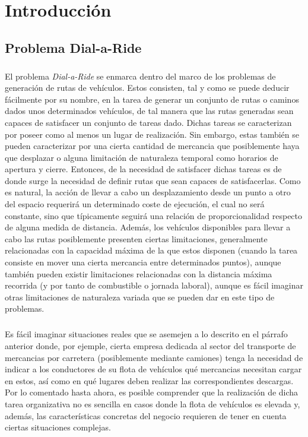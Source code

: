 \documentclass{subfiles}
\begin{document}
  \chapter{Introducción}
  \label{chap:introduction}

    \section{Problema Dial-a-Ride}
    \label{sec:introduction_dial_a_ride}

      \paragraph{}
      El problema \emph{Dial-a-Ride} se enmarca dentro del marco de los problemas de generación de rutas de vehículos. Estos consisten, tal y como se puede deducir fácilmente por su nombre, en la tarea de generar un conjunto de rutas o caminos dados unos determinados vehículos, de tal manera que las rutas generadas sean capaces de satisfacer un conjunto de tareas dado. Dichas tareas se caracterizan por poseer como al menos un lugar de realización. Sin embargo, estas también se pueden caracterizar por una cierta cantidad de mercancia que posiblemente haya que desplazar o alguna limitación de naturaleza temporal como horarios de apertura y cierre. Entonces, de la necesidad de satisfacer dichas tareas es de donde surge la necesidad de definir rutas que sean capaces de satisfacerlas. Como es natural, la acción de llevar a cabo un desplazamiento desde un punto a otro del espacio requerirá un determinado coste de ejecución, el cual no será constante, sino que típicamente seguirá una relación de proporcionalidad respecto de alguna medida de distancia. Además, los vehículos disponibles para llevar a cabo las rutas posiblemente presenten ciertas limitaciones, generalmente relacionadas con la capacidad máxima de la que estos disponen (cuando la tarea consiste en mover una cierta mercancia entre determinados puntos), aunque también pueden existir limitaciones relacionadas con la distancia máxima recorrida (y por tanto de combustible o jornada laboral), aunque es fácil imaginar otras limitaciones de naturaleza variada que se pueden dar en este tipo de problemas.

      \paragraph{}
      Es fácil imaginar situaciones reales que se asemejen a lo descrito en el párrafo anterior donde, por ejemple, cierta empresa dedicada al sector del transporte de mercancias por carretera (posiblemente mediante camiones) tenga la necesidad de indicar a los conductores de su flota de vehículos qué mercancias necesitan cargar en estos, así como en qué lugares deben realizar las correspondientes descargas. Por lo comentado hasta ahora, es posible comprender que la realización de dicha tarea organizativa no es sencilla en casos donde la flota de vehículos es elevada y, además, las características concretas del negocio requieren de tener en cuenta ciertas situaciones complejas.
\end{document}
